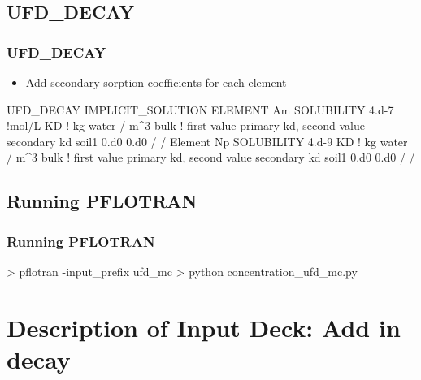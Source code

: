 \documentclass{beamer}
\newcommand\bluecomment[1]{{{\color{blue} #1}}}
\newcommand\magentacomment[1]{{{\color{magenta} #1}}}
\begin{document}
\subsection{UFD\_DECAY}

\begin{frame}[fragile]\frametitle{UFD\_DECAY}
	
	\begin{itemize}
		\item Add secondary sorption coefficients for each element
	\end{itemize}
	
	\begin{semiverbatim}
UFD_DECAY
  IMPLICIT_SOLUTION
  ELEMENT Am
    SOLUBILITY 4.d-7 \bluecomment{!mol/L}
    KD \bluecomment{! kg water / m^3 bulk}
    \bluecomment{! first value primary kd, second value secondary kd}
      soil1 0.d0 \magentacomment{0.d0} 
    /
  /
  Element Np
    SOLUBILITY 4.d-9
    KD \bluecomment{! kg water / m^3 bulk}
    \bluecomment{! first value primary kd, second value secondary kd}
      soil1 0.d0 \magentacomment{0.d0}
    /
  /
		
	\end{semiverbatim}
	
\end{frame}


\subsection{Running PFLOTRAN}

\begin{frame}[fragile]\frametitle{Running PFLOTRAN}

\begin{semiverbatim}


> pflotran -input_prefix ufd_mc
> python concentration_ufd_mc.py

\end{semiverbatim}

\end{frame}

\section{Description of Input Deck: Add in decay}
\end{document}
